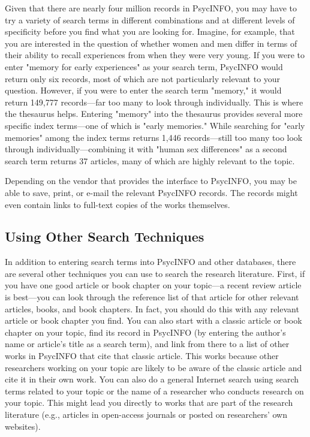 Given that there are nearly four million records in PsycINFO, you may have to try a variety of search terms in different combinations and at different levels of specificity before you find what you are looking for. Imagine, for example, that you are interested in the question of whether women and men differ in terms of their ability to recall experiences from when they were very young. If you were to enter "memory for early experiences" as your search term, PsycINFO would return only six records, most of which are not particularly relevant to your question. However, if you were to enter the search term "memory," it would return 149,777 records---far too many to look through individually. This is where the thesaurus helps. Entering "memory" into the thesaurus provides several more specific index terms---one of which is "early memories." While searching for "early memories" among the index terms returns 1,446 records---still too many too look through individually---combining it with "human sex differences" as a second search term returns 37 articles, many of which are highly relevant to the topic.

Depending on the vendor that provides the interface to PsycINFO, you may be able to save, print, or e-mail the relevant PsycINFO records. The records might even contain links to full-text copies of the works themselves.

\subsection{Using Other Search Techniques}

In addition to entering search terms into PsycINFO and other databases, there are several other techniques you can use to search the research literature. First, if you have one good article or book chapter on your topic---a recent review article is best---you can look through the reference list of that article for other relevant articles, books, and book chapters. In fact, you should do this with any relevant article or book chapter you find. You can also start with a classic article or book chapter on your topic, find its record in PsycINFO (by entering the author's name or article's title as a search term), and link from there to a list of other works in PsycINFO that cite that classic article. This works because other researchers working on your topic are likely to be aware of the classic article and cite it in their own work. You can also do a general Internet search using search terms related to your topic or the name of a researcher who conducts research on your topic. This might lead you directly to works that are part of the research literature (e.g., articles in open-access journals or posted on researchers' own websites).

